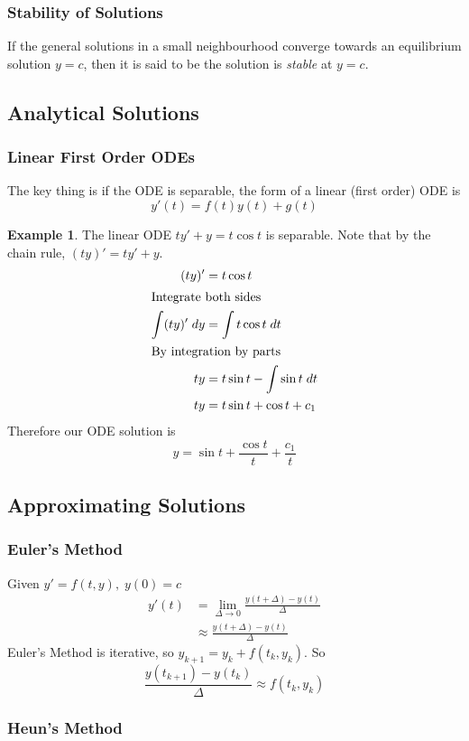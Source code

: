\documentclass{article}
\theoremstyle{remark}
\theoremstyle{definition}
\newtheorem{example}{Example}
\begin{document}
\begin{landscape}
\begin{multicols*}{3}
 \subsubsection*{Stability of Solutions}
 If the general solutions in a small neighbourhood converge towards an
 equilibrium solution \( y = c \), then it is said to be the solution is \textit{stable} at \(
 y = c\).
 \subsection*{Analytical Solutions}
 \subsubsection*{Linear First Order ODEs}
 The key thing is if the ODE is separable, the form of a linear (first order)
 ODE is
 \[ 
   y'(t) = f(t)y(t) + g(t)
 \]
 \begin{example}
 The linear ODE \( ty' + y = t\cos t \) is separable. Note that by the chain
 rule, \( (ty)' = ty' + y \).
 \begin{align*}
   (ty)' &= t\cos t\\
   \intertext{Integrate both sides}
   \int (ty)' \; dy &= \int t\cos t \; dt\\
   \intertext{By integration by parts}
   ty &= t\sin t - \int \sin t \; dt\\
   ty &= t\sin t + \cos t + c_1\\
 \end{align*}
 Therefore our ODE solution is
 \[ 
   y = \sin t + \frac{\cos t}{t} + \frac{c_1}{t}
 \]
 \end{example}
 \subsection*{Approximating Solutions}
 \subsubsection*{Euler's Method}
 Given \( y' = f(t,y), \; y(0) = c \)
 \begin{align*}
   y'(t) &= \displaystyle \lim_{\Delta  \to 0} \frac{y(t + \Delta)
   - y(t)}{\Delta}\\
   &\approx \frac{y(t + \Delta) - y(t)}{\Delta}
 \end{align*}
 Euler's Method is iterative, so \( y_{k+1} = y_k + f(t_k, y_k) \). So
 \[ 
   \frac{y(t_{k+1}) - y(t_k)}{\Delta} \approx f(t_k, y_k)
 \]

 \subsubsection*{Heun's Method}


\end{multicols*}
\end{landscape}
\end{document}
